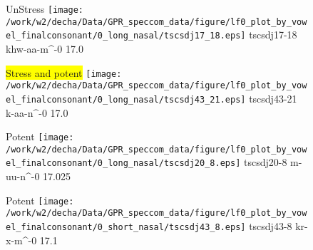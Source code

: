 \documentclass{article}
\begin{document}
\begin{figure}[t]
\begin{minipage}[b]{.24\textwidth}
UnStress
\centering
\texttt{[image: /work/w2/decha/Data/GPR\_speccom\_data/figure/lf0\_plot\_by\_vowel\_finalconsonant/0\_long\_nasal/tscsdj17\_18.eps]}
tscsdj17-18 khw-aa-m\textasciicircum-0 17.0
\end{minipage}
\begin{minipage}[b]{.24\textwidth}
\colorbox{yellow}{Stress and potent}
\centering
\texttt{[image: /work/w2/decha/Data/GPR\_speccom\_data/figure/lf0\_plot\_by\_vowel\_finalconsonant/0\_long\_nasal/tscsdj43\_21.eps]}
tscsdj43-21 k-aa-n\textasciicircum-0 17.0
\end{minipage}
\begin{minipage}[b]{.24\textwidth}
\colorbox{Apricot}{Potent}
\centering
\texttt{[image: /work/w2/decha/Data/GPR\_speccom\_data/figure/lf0\_plot\_by\_vowel\_finalconsonant/0\_long\_nasal/tscsdj20\_8.eps]}
tscsdj20-8 m-uu-n\textasciicircum-0 17.025
\end{minipage}
\begin{minipage}[b]{.24\textwidth}
\colorbox{Apricot}{Potent}
\centering
\texttt{[image: /work/w2/decha/Data/GPR\_speccom\_data/figure/lf0\_plot\_by\_vowel\_finalconsonant/0\_short\_nasal/tscsdj43\_8.eps]}
tscsdj43-8 kr-x-m\textasciicircum-0 17.1
\end{minipage}
\end{figure}
\end{document}
